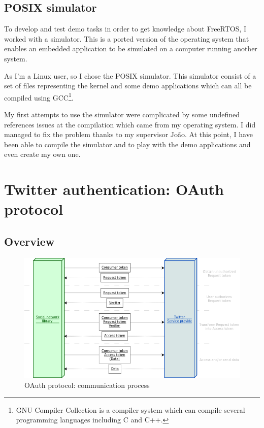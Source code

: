 \subsection{POSIX simulator}

\hspace{15mm}To develop and test demo tasks in order to get knowledge about FreeRTOS, I worked with a simulator. This is a ported version of the operating system that enables an embedded application to be simulated on a computer running another system.

As I'm a Linux user, so I chose the POSIX simulator. This simulator consist of a set of files representing the kernel and some demo applications which can all be compiled using GCC\footnote{GNU Compiler Collection is a compiler system which can compile several programming languages including C and C++.}.

My first attempts to use the simulator were complicated by some undefined references issues at the compilation which came from my operating system. I did managed to fix the problem thanks to my supervisor Jo\~{a}o. At this point, I have been able to compile the simulator and to play with the demo applications and even create my own one.



\section{Twitter authentication: OAuth protocol}

\subsection{Overview}


\begin{figure}[h]
  \centering
  \includegraphics[scale=0.75]{images/oauth.png}
  \caption{OAuth protocol: communication process}
\end{figure}

